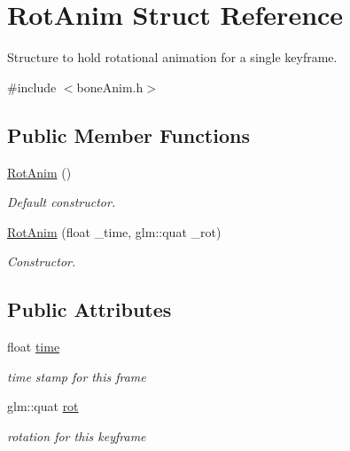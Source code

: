 \hypertarget{structRotAnim}{}\section{Rot\+Anim Struct Reference}
\label{structRotAnim}


Structure to hold rotational animation for a single keyframe.  




{\ttfamily \#include $<$bone\+Anim.\+h$>$}

\subsection*{Public Member Functions}
\begin{DoxyCompactItemize}
\item 
\hyperlink{structRotAnim_a3f486b2d4b662dc0d0d09fbdc78cdf52}{Rot\+Anim} ()\hypertarget{structRotAnim_a3f486b2d4b662dc0d0d09fbdc78cdf52}{}\label{structRotAnim_a3f486b2d4b662dc0d0d09fbdc78cdf52}

\begin{DoxyCompactList}\small\item\em Default constructor. \end{DoxyCompactList}\item 
\hyperlink{structRotAnim_a23c12965c154210b01e4776fed619c97}{Rot\+Anim} (float \+\_\+time, glm\+::quat \+\_\+rot)\hypertarget{structRotAnim_a23c12965c154210b01e4776fed619c97}{}\label{structRotAnim_a23c12965c154210b01e4776fed619c97}

\begin{DoxyCompactList}\small\item\em Constructor. \end{DoxyCompactList}\end{DoxyCompactItemize}
\subsection*{Public Attributes}
\begin{DoxyCompactItemize}
\item 
float \hyperlink{structRotAnim_a9cf83617605bbca9d37c5685b033ec02}{time}\hypertarget{structRotAnim_a9cf83617605bbca9d37c5685b033ec02}{}\label{structRotAnim_a9cf83617605bbca9d37c5685b033ec02}

\begin{DoxyCompactList}\small\item\em time stamp for this frame \end{DoxyCompactList}\item 
glm\+::quat \hyperlink{structRotAnim_a842aa0e88433ecb79e2f1c6a47c5198d}{rot}\hypertarget{structRotAnim_a842aa0e88433ecb79e2f1c6a47c5198d}{}\label{structRotAnim_a842aa0e88433ecb79e2f1c6a47c5198d}

\begin{DoxyCompactList}\small\item\em rotation for this keyframe \end{DoxyCompactList}\end{DoxyCompactItemize}


